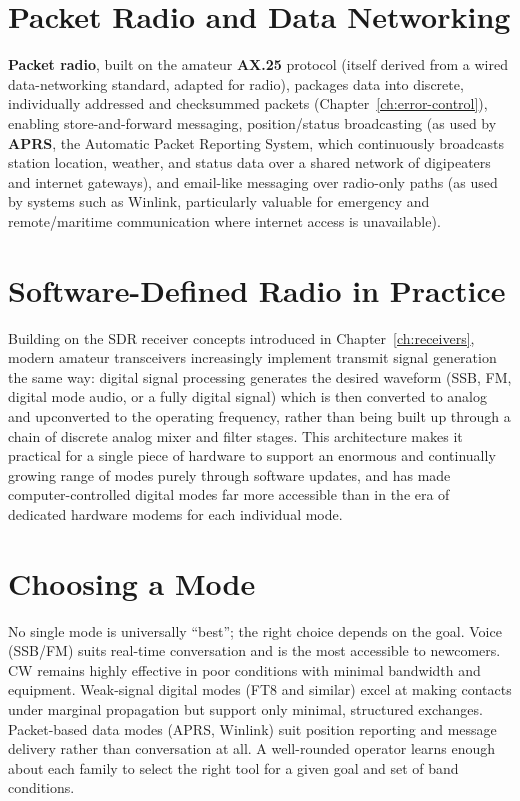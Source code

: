 \section{Packet Radio and Data Networking}

\textbf{Packet radio}, built on the amateur \textbf{AX.25} protocol
(itself derived from a wired data-networking standard, adapted for
radio), packages data into discrete, individually addressed and
checksummed packets (Chapter~\ref{ch:error-control}), enabling
store-and-forward messaging, position/status broadcasting (as used by
\textbf{APRS}, the Automatic Packet Reporting System, which
continuously broadcasts station location, weather, and status data over
a shared network of digipeaters and internet gateways), and
email-like messaging over radio-only paths (as used by systems such as
Winlink, particularly valuable for emergency and remote/maritime
communication where internet access is unavailable).

\section{Software-Defined Radio in Practice}

Building on the SDR receiver concepts introduced in
Chapter~\ref{ch:receivers}, modern amateur transceivers increasingly
implement transmit signal generation the same way: digital signal
processing generates the desired waveform (SSB, FM, digital mode audio,
or a fully digital signal) which is then converted to analog and
upconverted to the operating frequency, rather than being built up
through a chain of discrete analog mixer and filter stages. This
architecture makes it practical for a single piece of hardware to
support an enormous and continually growing range of modes purely
through software updates, and has made computer-controlled digital
modes far more accessible than in the era of dedicated
hardware modems for each individual mode.

\section{Choosing a Mode}

\begin{keyidea}
No single mode is universally ``best''; the right choice depends on the
goal. Voice (SSB/FM) suits real-time conversation and is the most
accessible to newcomers. CW remains highly effective in poor conditions
with minimal bandwidth and equipment. Weak-signal digital modes (FT8
and similar) excel at making contacts under marginal propagation but
support only minimal, structured exchanges. Packet-based data modes
(APRS, Winlink) suit position reporting and message delivery rather
than conversation at all. A well-rounded operator learns enough about
each family to select the right tool for a given goal and set of band
conditions.
\end{keyidea}

